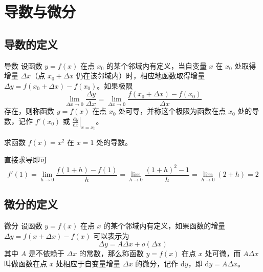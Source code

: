 \chapter{导数与微分}

\section{导数的定义}

\begin{definition}{导数}{}
设函数 \( y = f(x) \) 在点 \( x_0 \) 的某个邻域内有定义，当自变量 \( x \) 在 \( x_0 \) 处取得增量 \( \Delta x \)（点 \( x_0 + \Delta x \) 仍在该邻域内）时，相应地函数取得增量 \( \Delta y = f(x_0 + \Delta x) - f(x_0) \)。如果极限
\[ \lim_{\Delta x \to 0} \frac{\Delta y}{\Delta x} = \lim_{\Delta x \to 0} \frac{f(x_0 + \Delta x) - f(x_0)}{\Delta x} \]
存在，则称函数 \( y = f(x) \) 在点 \( x_0 \) 处可导，并称这个极限为函数在点 \( x_0 \) 处的导数，记作 \( f'(x_0) \) 或 \( \left. \frac{\mathrm{d} y}{\mathrm{d} x} \right|_{x = x_0} \)。
\end{definition}

\begin{example}{}{}
求函数 \( f(x) = x^2 \) 在 \( x = 1 \) 处的导数。
\end{example}

\begin{solution}
直接求导即可
    \[
f'(1) = \lim_{h \to 0} \frac{f(1+h) - f(1)}{h} = \lim_{h \to 0} \frac{(1+h)^2 - 1}{h} = \lim_{h \to 0} (2 + h) = 2
\]
\end{solution}

\section{微分的定义}

\begin{definition}{微分}{}
设函数 \( y = f(x) \) 在点 \( x \) 的某个邻域内有定义，如果函数的增量 \( \Delta y = f(x + \Delta x) - f(x) \) 可以表示为
\[ \Delta y = A \Delta x + o(\Delta x) \]
其中 \( A \) 是不依赖于 \( \Delta x \) 的常数，那么称函数 \( y = f(x) \) 在点 \( x \) 处可微，而 \( A \Delta x \) 叫做函数在点 \( x \) 处相应于自变量增量 \( \Delta x \) 的微分，记作 \( \mathrm{d}y \)，即 \( \mathrm{d}y = A \Delta x \)。
\end{definition}

